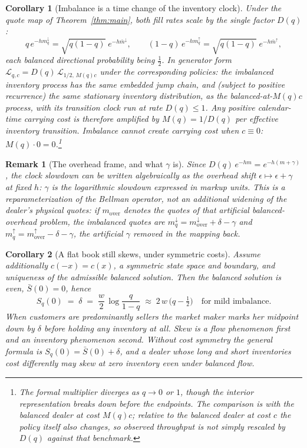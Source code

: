 \documentclass[11pt]{article}
\newtheorem{corollary}{Corollary}
\newtheorem{remark}{Remark}
\begin{document}
\begin{corollary}[Imbalance is a time change of the inventory clock]\label{cor:carry}
Under the quote map of Theorem~\ref{thm:main}, both fill rates scale by the single factor $D(q)$:
\[
q\,e^{-h m^{\downarrow}_q} = \sqrt{q(1-q)}\; e^{-h \bar m^{\downarrow}}, \qquad
(1-q)\,e^{-h m^{\uparrow}_q} = \sqrt{q(1-q)}\; e^{-h \bar m^{\uparrow}} ,
\]
each balanced directional probability being $\tfrac12$. In generator form $\mathcal L_{q,c} = D(q)\,\mathcal L_{1/2,\,M(q)c}$ under the corresponding policies: the imbalanced inventory process has the same embedded jump chain, and (subject to positive recurrence) the same stationary inventory distribution, as the balanced-at-$M(q)c$ process, with its transition clock run at rate $D(q) \le 1$. Any positive calendar-time carrying cost is therefore amplified by $M(q) = 1/D(q)$ per effective inventory transition. Imbalance cannot create carrying cost when $c \equiv 0$: $M(q) \cdot 0 = 0$.\footnote{The formal multiplier diverges as $q \to 0$ or $1$, though the interior representation breaks down before the endpoints. The comparison is with the balanced dealer at cost $M(q)c$; relative to the balanced dealer at cost $c$ the policy itself also changes, so observed throughput is not simply rescaled by $D(q)$ against that benchmark.}
\end{corollary}

\begin{remark}[The overhead frame, and what $\gamma$ is]\label{rem:overhead}
Since $D(q)\,e^{-hm} = e^{-h(m+\gamma)}$, the clock slowdown can be written algebraically as the overhead shift $\epsilon \mapsto \epsilon + \gamma$ at fixed $h$: $\gamma$ is the logarithmic slowdown expressed in markup units. This is a reparameterization of the Bellman operator, not an additional widening of the dealer's physical quotes: if $m_{\mathrm{over}}$ denotes the quotes of that artificial balanced-overhead problem, the imbalanced quotes are $m^{\downarrow}_q = m^{\downarrow}_{\mathrm{over}} + \delta - \gamma$ and $m^{\uparrow}_q = m^{\uparrow}_{\mathrm{over}} - \delta - \gamma$, the artificial $\gamma$ removed in the mapping back.
\end{remark}

\begin{corollary}[A flat book still skews, under symmetric costs]\label{cor:zeroskew}
Assume additionally $c(-x) = c(x)$, a symmetric state space and boundary, and uniqueness of the admissible balanced solution. Then the balanced solution is even, $\bar S(0) = 0$, hence
\begin{equation}
S_q(0) \;=\; \delta \;=\; \frac{w}{2}\,\log\frac{q}{1-q} \;\approx\; 2\,w\,\Big(q - \tfrac12\Big)
\quad\text{for mild imbalance.}
\label{eq:zeroskew}
\end{equation}
When customers are predominantly sellers the market maker marks her midpoint down by $\delta$ before holding any inventory at all. Skew is a flow phenomenon first and an inventory phenomenon second. Without cost symmetry the general formula is $S_q(0) = \bar S(0) + \delta$, and a dealer whose long and short inventories cost differently may skew at zero inventory even under balanced flow.
\end{corollary}
\end{document}
